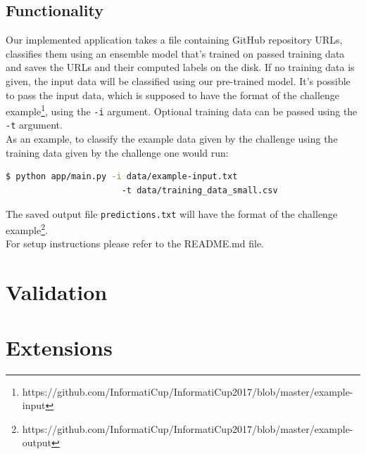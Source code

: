 \documentclass[%
a4paper,
DIV12,
2.5headlines,
bigheadings,
titlepage,
openbib,
]{scrartcl}
\begin{document}
\subsection{Functionality}\label{functionality}

Our implemented application takes a file containing GitHub repository URLs, classifies them using an ensemble model that's trained on passed training data and saves the URLs and their computed labels on the disk.
If no training data is given, the input data will be classified using our pre-trained model.
It's possible to pass the input data, which is supposed to have the format of the challenge example\footnote{https://github.com/InformatiCup/InformatiCup2017/blob/master/example-input}, using the \texttt{-i} argument.
Optional training data can be passed using the \texttt{-t} argument.\\
As an example, to classify the example data given by the challenge using the training data given by the challenge one would run:

\begin{lstlisting}[language=bash]
  $ python app/main.py -i data/example-input.txt
                       -t data/training_data_small.csv
\end{lstlisting}

The saved output file \texttt{predictions.txt} will have the format of the challenge example\footnote{https://github.com/InformatiCup/InformatiCup2017/blob/master/example-output}.\\
For setup instructions please refer to the README.md file.

\section{Validation}\label{validation}


\section{Extensions}\label{extensions}
\end{document}
